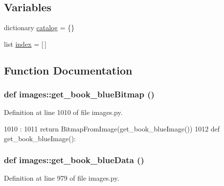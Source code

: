 \subsection*{Variables}
\begin{DoxyCompactItemize}
\item 
dictionary \hyperlink{namespaceimages_ab6e2df196c0462d557cd3bb46ddf7166}{catalog} = \{\}
\item 
list \hyperlink{namespaceimages_a1e4ca93eea3db045fe09f3cb4622c507}{index} = \mbox{[}$\,$\mbox{]}
\end{DoxyCompactItemize}


\subsection{Function Documentation}
\hypertarget{namespaceimages_abcb73009bbb67720466d628633a1cbf1}{
\subsubsection[{get\_\-book\_\-blueBitmap}]{\setlength{\rightskip}{0pt plus 5cm}def images::get\_\-book\_\-blueBitmap ()}}
\label{namespaceimages_abcb73009bbb67720466d628633a1cbf1}


Definition at line 1010 of file images.py.


\begin{DoxyCode}
1010                          :
1011     return BitmapFromImage(get_book_blueImage())
1012 
def get_book_blueImage():
\end{DoxyCode}
\hypertarget{namespaceimages_ad11439024a6dc7a18e34b18a3e3a0685}{
\subsubsection[{get\_\-book\_\-blueData}]{\setlength{\rightskip}{0pt plus 5cm}def images::get\_\-book\_\-blueData ()}}
\label{namespaceimages_ad11439024a6dc7a18e34b18a3e3a0685}


Definition at line 979 of file images.py.


